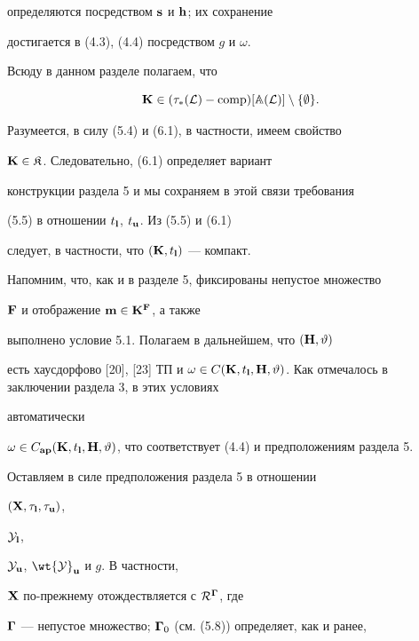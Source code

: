 определяются посредством ${\bold s}$ и ${\bold h}$; их сохранение


достигается в (4.3), (4.4) посредством $g$ и $\omega$.


Всюду в данном разделе полагаем, что


\begin{equation}


{\bold K} \in ({{\tau}_*}({\cal L}) - {\comp})[{\Bbb A}({\cal L})]


\setminus \{\emp\}.


\end{equation}





Разумеется, в силу (5.4) и (6.1), в частности, имеем свойство


${\bold K} \in {\frak K}$. Следовательно, (6.1) определяет вариант


конструкции раздела 5 и мы сохраняем в этой связи требования


(5.5) в отношении ${t_{\bold l}}$, ${t_{\bold u}}$. Из (5.5) и (6.1)


следует, в частности, что $({\bold K},{t_{\bold l}})$ --- компакт.


Напомним, что, как и в разделе 5, фиксированы непустое множество


${\bold F}$ и отображение ${\bold m} \in {{\bold K}^{\bold F}}$, а также


выполнено условие 5.1. Полагаем в дальнейшем, что $({\bold H},\vartheta)$


есть хаусдорфово [20], [23] ТП и $\omega \in C({\bold K},{t_{\bold l}},


{\bold H},\vt)$. Как отмечалось в заключении раздела 3, в этих условиях


автоматически


$\omega \in {C_{{\bold a}{\bold p}}}({\bold K},{t_{\bold l}},{\bold H},


\vt)$, что соответствует (4.4) и предположениям раздела 5.


Оставляем в силе предположения раздела 5 в отношении


$({\bold X},{{\tau}_{\bold l}},{{\tau}_{\bold u}})$,


${{\cal Y}_{\bold l}}$,


${{\cal Y}_{\bold u}}$, ${\wt {\cal Y}}_{\bold u}$ и $g$. В частности,


${\bold X}$ по-прежнему отождествляется с ${{\cal R}^{\boldsymbol \Gamma}}$, где


$\boldsymbol \Gamma$ --- непустое множество; ${\boldsymbol \Gamma}_0$ (см. (5.8)) определяет, как и ранее,


